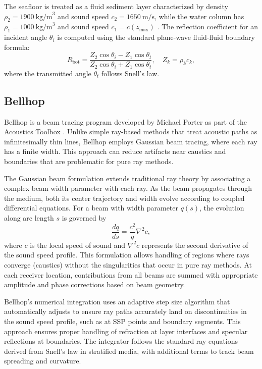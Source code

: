 \documentclass[fleqn]{jaes}
\begin{document}
The seafloor is treated as a fluid sediment layer characterized by density
$\rho_2 = 1900~\text{kg/m}^3$ and sound speed $c_2 = 1650~\text{m/s}$, while
the water column has $\rho_1 = 1000~\text{kg/m}^3$ and sound speed
$c_1 = c(z_{\max})$ \cite{Jensen}.  
The reflection coefficient for an incident angle $\theta_i$ is computed using
the standard plane-wave fluid-fluid boundary formula:
\begin{equation}
R_{\text{bot}}
 = \frac{Z_2\cos\theta_i - Z_1\cos\theta_t}
        {Z_2\cos\theta_i + Z_1\cos\theta_t},
\quad
Z_k = \rho_k c_k,
\end{equation}
where the transmitted angle $\theta_t$ follows Snell’s law.

\subsection{Bellhop}
Bellhop is a beam tracing program developed by Michael Porter as part of the Acoustics Toolbox \cite{Porter}. Unlike simple ray-based methods that treat acoustic paths as infinitesimally thin lines, Bellhop employs Gaussian beam tracing, where each ray has a finite width. This approach can reduce artifacts near caustics and boundaries that are problematic for pure ray methods.

The Gaussian beam formulation extends traditional ray theory by associating a complex beam width parameter with each ray. As the beam propagates through the medium, both its center trajectory and width evolve according to coupled differential equations. For a beam with width parameter $q(s)$, the evolution along arc length $s$ is governed by
\begin{equation}
\frac{dq}{ds} = \frac{c^2}{q} \nabla^2 c,
\end{equation}
where $c$ is the local speed of sound and $\nabla^2 c$ represents the second derivative of the sound speed profile. This formulation allows handling of regions where rays converge (caustics) without the singularities that occur in pure ray methods. At each receiver location, contributions from all beams are summed with appropriate amplitude and phase corrections based on beam geometry.

Bellhop's numerical integration uses an adaptive step size algorithm that automatically adjusts to ensure ray paths accurately land on discontinuities in the sound speed profile, such as at SSP points and boundary segments. This approach ensures proper handling of refraction at layer interfaces and specular reflections at boundaries. The integrator follows the standard ray equations derived from Snell's law in stratified media, with additional terms to track beam spreading and curvature.
\end{document}
